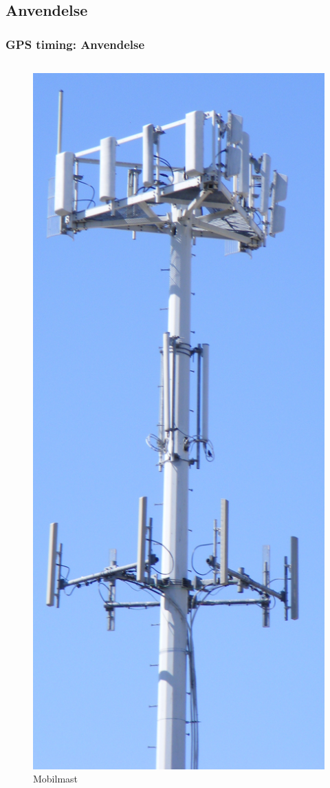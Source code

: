\documentclass[xcolor=table]{beamer}
\begin{document}
\subsection{Anvendelse}
\begin{frame}
\frametitle{GPS timing: Anvendelse}
  \begin{columns}
          \hspace{-50pt}
      \begin{figure}
        \includegraphics[scale=0.045]{thesis/graphics/Cell-Tower.jpg}
        \caption{Mobilmast \cite{CELLTOWER}}
      \end{figure}


\end{columns}
\end{frame}
\end{document}
